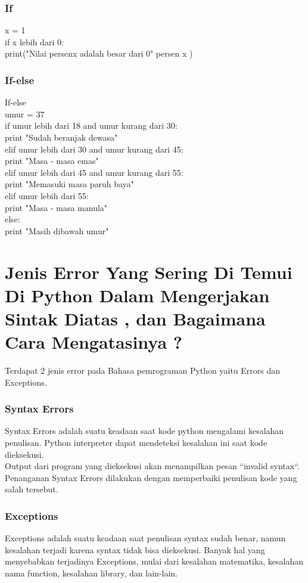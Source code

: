 \subsubsection{If}
x = 1\\
if x lebih dari 0:\\
	print("Nilai persenx adalah besar dari 0" persen x )
\subsubsection{If-else}
If-else\\
umur = 37\\
if umur lebih dari 18 and umur kurang dari 30:\\
    print "Sudah beranjak dewasa"\\
elif umur lebih dari 30 and umur kurang dari 45:\\
    print "Masa - masa emas"\\
elif umur lebih dari 45 and umur kurang dari 55:\\
    print "Memasuki masa paruh baya"\\
elif umur lebih dari 55:\\
    print "Masa - masa manula"\\
else:\\
    print "Masih dibawah umur"
    
\section{Jenis Error  Yang Sering Di Temui Di Python Dalam Mengerjakan Sintak Diatas , dan Bagaimana Cara Mengatasinya ?}

Terdapat 2 jenis error pada Bahasa pemrograman Python yaitu Errors dan Exceptions.
\subsubsection{Syntax Errors}
Syntax Errors adalah suatu keadaan saat kode python mengalami kesalahan penulisan. Python interpreter dapat mendeteksi kesalahan ini saat kode dieksekusi.\\
Output dari program yang dieksekusi akan menampilkan pesan “invalid syntax“. Penanganan Syntax Errors dilakukan dengan memperbaiki penulisan kode yang salah tersebut.
\subsubsection{ Exceptions}
Exceptions adalah suatu keadaan saat penulisan syntax sudah benar, namun kesalahan terjadi karena syntax tidak bisa dieksekusi. Banyak hal yang menyebabkan terjadinya Exceptions, mulai dari kesalahan matematika, kesalahan nama function, kesalahan library, dan lain-lain.\\

